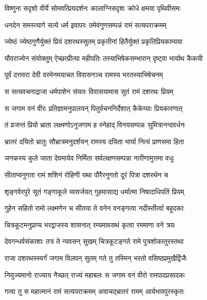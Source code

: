\twolineshloka
{विष्णुना सदृशो वीर्ये सोमवत्प्रियदर्शनः}
{कालाग्निसदृशः क्रोधे क्षमया पृथिवीसमः} %

\twolineshloka
{धनदेन समस्त्यागे सत्ये धर्म इवापरः}
{तमेवंगुणसम्पन्नं रामं सत्यपराक्रमम्} %

\twolineshloka
{ज्येष्ठं ज्येष्ठगुणैर्युक्तं प्रियं दशरथस्सुतम्}
{प्रकृतीनां हितैर्युक्तं प्रकृतिप्रियकाम्यया} %

\twolineshloka
{यौवराज्येन संयोक्तुम् ऐच्छत्प्रीत्या महीपतिः}
{तस्याभिषेकसम्भारान् दृष्ट्वा भार्याथ कैकयी} %

\twolineshloka
{पूर्वं दत्तवरा देवी वरमेनमयाचत}
{विवासनञ्च रामस्य भरतस्याभिषेचनम्} %

\twolineshloka
{स सत्यवचनाद्राजा धर्मपाशेन संयतः}
{विवासयामास सुतं रामं दशरथः प्रियम्} %

\twolineshloka
{स जगाम वनं वीरः प्रतिज्ञामनुपालयन्}
{पितुर्वचननिर्देशात् कैकेय्याः प्रियकारणात्} %

\twolineshloka
{तं व्रजन्तं प्रियो भ्राता लक्ष्मणोऽनुजगाम ह}
{स्नेहाद् विनयसम्पन्नः सुमित्रानन्दवर्धनः} %

\twolineshloka
{भ्रातरं दयितो भ्रातुः सौभ्रात्रमनुदर्शयन्}
{रामस्य दयिता भार्या नित्यं प्राणसमा हिता} %

\twolineshloka
{जनकस्य कुले जाता देवमायेव निर्मिता}
{सर्वलक्षणसम्पन्ना नारीणामुत्तमा वधूः} %

\twolineshloka
{सीताप्यनुगता रामं शशिनं रोहिणी यथा}
{पौरैरनुगतो दूरं पित्रा दशरथेन च} %

\twolineshloka
{शृङ्गवेरपुरे सूतं गङ्गाकूले व्यसर्जयत्}
{गुहमासाद्य धर्मात्मा निषादाधिपतिं प्रियम्} %

\twolineshloka
{गुहेन सहितो रामो लक्ष्मणेन च सीतया}
{ते वनेन वनङ्गत्वा नदीस्तीर्त्वा बहूदकाः} %

\twolineshloka
{चित्रकूटमनुप्राप्य भरद्वाजस्य शासनात्}
{रम्यमावसथं कृत्वा रममाणा वने त्रयः} %

\twolineshloka
{देवगन्धर्वसंकाशाः तत्र ते न्यवसन् सुखम्}
{चित्रकूटङ्गते रामे पुत्रशोकातुरस्तथा} %

\twolineshloka
{राजा दशरथस्स्वर्गं जगाम विलपन् सुतम्}
{गते तु तस्मिन् भरतो वसिष्ठप्रमुखैर्द्विजैः} %

\twolineshloka
{नियुज्यमानो राज्याय नैच्छत् राज्यं महाबलः}
{स जगाम वनं वीरो रामपादप्रसादकः} %

\twolineshloka
{गत्वा तु स महात्मानं रामं सत्यपराक्रमम्}
{अयाचद्भ्रातरं रामम् आर्यभावपुरस्कृतः} %

